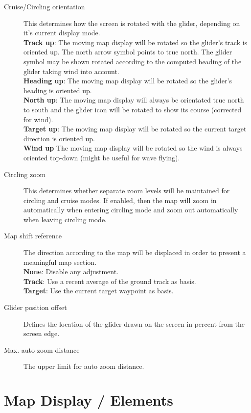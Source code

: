 \begin{description}
\item[Cruise/Circling orientation]  \label{conf:orientation} This determines how
  the screen is rotated with the glider, depending on it's current display mode. \\
  {\bf Track up}: The moving map display will be rotated so the glider's track
  is oriented up. The north arrow symbol points to true north. The glider symbol 
  may be shown rotated according to the computed heading of the glider taking 
  wind into account. \\
  {\bf Heading up}: The moving map display will be rotated so the glider's 
  heading is oriented up. \\
  {\bf North up}: The moving map display will always be orientated true north to
  south and the glider icon will be rotated to show its course (corrected for
  wind). \\
  {\bf Target up}: The moving map display will be rotated so the current target
  direction is oriented up. \\
  {\bf Wind up} The moving map display will be rotated so the wind is always 
  oriented top-down (might be useful for wave flying).
\item[Circling zoom]  \label{conf:circlingzoom} This determines whether separate
  zoom levels will be maintained for circling and cruise modes.  If enabled, then the 
  map will zoom in automatically when entering circling mode and zoom out
  automatically when leaving circling mode.
\item[Map shift reference]  The direction according to the map will be displaced 
  in order to present a meaningful map section. \\
  {\bf None}: Disable any adjustment. \\
  {\bf Track}: Use a recent average of the ground track as basis. \\
  {\bf Target}: Use the current target waypoint as basis.
\item[Glider position offset]  \label{conf:gliderposition} Defines the location of the 
  glider drawn on the screen in percent from the screen edge.
\item[Max. auto zoom distance]  The upper limit for auto zoom distance.
\end{description}


\section{Map Display / Elements}\label{sec:map-elements}

